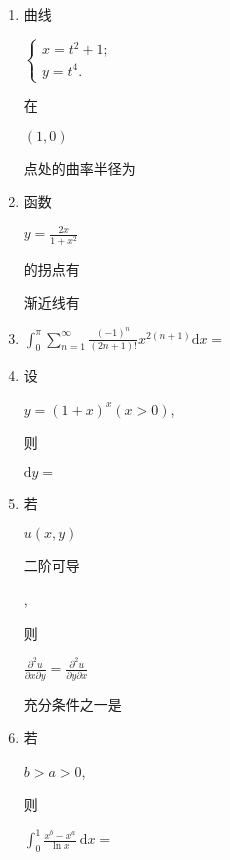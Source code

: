 \documentclass[10pt]{article}
\begin{document}
\begin{enumerate}
  \item \begin{CJK}{UTF8}{mj}曲线\end{CJK} $\left\{\begin{array}{l}x=t^{2}+1 ; \\ y=t^{4} .\end{array}\right.$ \begin{CJK}{UTF8}{mj}在\end{CJK} $(1,0)$ \begin{CJK}{UTF8}{mj}点处的曲率半径为\end{CJK}

  \item \begin{CJK}{UTF8}{mj}函数\end{CJK} $y=\frac{2 x}{1+x^{2}}$ \begin{CJK}{UTF8}{mj}的拐点有\end{CJK} \begin{CJK}{UTF8}{mj}渐近线有\end{CJK}

  \item $\int_{0}^{\pi} \sum_{n=1}^{\infty} \frac{(-1)^{n}}{(2 n+1) !} x^{2(n+1)} \mathrm{d} x=$

  \item \begin{CJK}{UTF8}{mj}设\end{CJK} $y=(1+x)^{x}(x>0)$, \begin{CJK}{UTF8}{mj}则\end{CJK} $\mathrm{d} y=$

  \item \begin{CJK}{UTF8}{mj}若\end{CJK} $u(x, y)$ \begin{CJK}{UTF8}{mj}二阶可导\end{CJK}, \begin{CJK}{UTF8}{mj}则\end{CJK} $\frac{\partial^{2} u}{\partial x \partial y}=\frac{\partial^{2} u}{\partial y \partial x}$ \begin{CJK}{UTF8}{mj}充分条件之一是\end{CJK}

  \item \begin{CJK}{UTF8}{mj}若\end{CJK} $b>a>0$, \begin{CJK}{UTF8}{mj}则\end{CJK} $\int_{0}^{1} \frac{x^{b}-x^{a}}{\ln x} \mathrm{~d} x=$


\end{enumerate}
\end{document}
